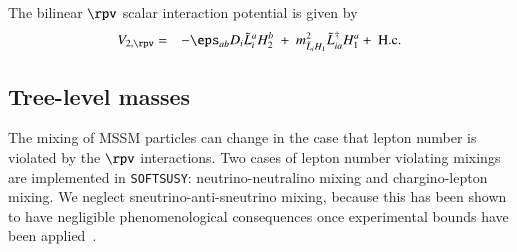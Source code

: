 \documentclass[final,3p,times,pdflatex]{elsarticle}
\def\SOFTSUSY{{\tt SOFTSUSY}}
\begin{document}
The bilinear $\rpv$ scalar interaction potential is given by
\begin{eqnarray}
  V_{2, \rpv} &=& -\eps_{ab} D_i \tilde{L}_i^a H_2^b~+~m^2_{\tilde L_i H_1}\tilde{L}^\dagger_{ia}H_1^a +~{\rm H.c.}
  \label{softhaberbil}
\end{eqnarray}


\subsection{Tree-level masses \label{sec:tree}}

The mixing of
MSSM particles can change in the case that lepton number is violated by the
$\rpv$ interactions. Two cases of lepton number violating mixings are
implemented in \SOFTSUSY: neutrino-neutralino mixing and
chargino-lepton mixing. We neglect sneutrino-anti-sneutrino
mixing, because this has been shown to have negligible
phenomenological consequences once experimental bounds have been
applied~\cite{Dedes:2007ef}.  
\end{document}
